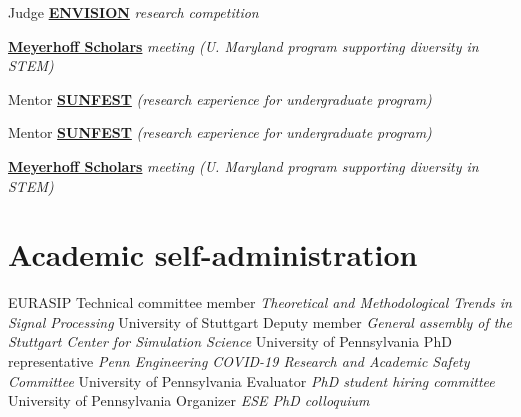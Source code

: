 \documentclass[highlights,publist]{cvlfoc}
\begin{document}
\begin{entrydate}
		{Judge}
		{\href{http://envisionrc.com/}{\textbf{ENVISION}}
			\emph{research competition}}

		{}
		{\href{https://meyerhoff.umbc.edu/}{\textbf{Meyerhoff Scholars}}
			\emph{meeting (U. Maryland program supporting diversity in STEM)}}

		{Mentor}
		{\href{https://sunfest.seas.upenn.edu}{\textbf{SUNFEST}}
			\emph{(research experience for undergraduate program)}}

		{Mentor}
		{\href{https://sunfest.seas.upenn.edu}{\textbf{SUNFEST}}
			\emph{(research experience for undergraduate program)}}

		{}
		{\href{https://meyerhoff.umbc.edu/}{\textbf{Meyerhoff Scholars}}
			\emph{meeting (U. Maryland program supporting diversity in STEM)}}
\end{entrydate}




\section*{Academic self-administration}

\begin{entrydate}
		{EURASIP}
		{Technical committee member}
		{\textit{Theoretical and Methodological Trends
			in Signal Processing}}
		{University of Stuttgart}
		{Deputy member}
		{\textit{General assembly of the Stuttgart Center for Simulation Science}}
		{University of Pennsylvania}
		{PhD representative}
		{\textit{Penn Engineering COVID-19 Research and Academic Safety Committee}}
		{University of Pennsylvania}
		{Evaluator}
		{\textit{PhD student hiring committee}}
		{University of Pennsylvania}
		{Organizer}
		{\textit{ESE PhD colloquium}}
\end{entrydate}
\end{document}
